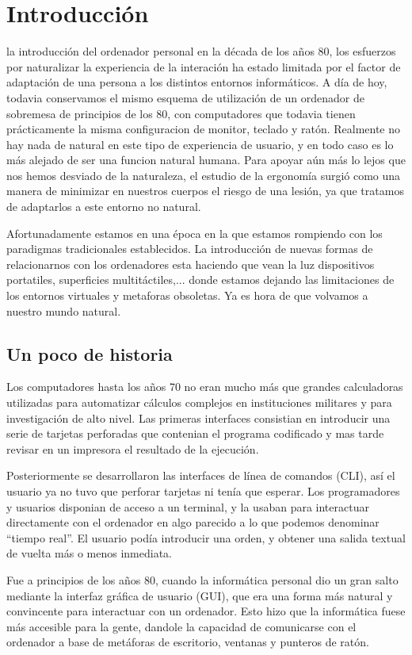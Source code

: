 \chapter{Introducción}
 la introducción del ordenador personal en la década de los años 80, los esfuerzos por naturalizar la experiencia de la interación ha estado limitada por el factor de adaptación de una persona a los distintos entornos informáticos. A día de hoy, todavia conservamos el mismo esquema de utilización de un ordenador de sobremesa de principios de los 80, con computadores que todavia tienen prácticamente la misma configuracion de monitor, teclado y ratón. Realmente no hay nada de natural en este tipo de experiencia de usuario, y en todo caso es lo más alejado de ser una funcion natural humana. Para apoyar aún más lo lejos que nos hemos desviado de la naturaleza, el estudio de la ergonomía surgió como una manera de minimizar en nuestros cuerpos el riesgo de una lesión, ya que tratamos de adaptarlos a este entorno no natural.

Afortunadamente estamos en una época en la que estamos rompiendo con los paradigmas tradicionales establecidos. La introducción de nuevas formas de relacionarnos con los ordenadores esta haciendo que vean la luz dispositivos portatiles, superficies multitáctiles,... donde estamos dejando las limitaciones de los entornos virtuales y metaforas obsoletas. Ya es hora de que volvamos a nuestro mundo natural.

\section{Un poco de historia}
Los computadores hasta los años 70 no eran mucho más que grandes calculadoras utilizadas para automatizar cálculos complejos en instituciones militares y para investigación de alto nivel. Las primeras interfaces consistian en introducir una serie de tarjetas perforadas que contenian el programa codificado y mas tarde revisar en un impresora el resultado de la ejecución.

Posteriormente se desarrollaron las interfaces de línea de comandos (CLI), así el usuario ya no tuvo que perforar tarjetas ni tenía que esperar. Los programadores y usuarios disponian de acceso a un terminal, y la usaban para interactuar directamente con el ordenador en algo parecido a lo que podemos denominar ``tiempo real''. El usuario podía introducir una orden, y obtener una salida textual de vuelta más o menos inmediata.

Fue a principios de los años 80, cuando la informática personal dio un gran salto mediante la interfaz gráfica de usuario (GUI), que era una forma más natural y convincente para interactuar con un ordenador. Esto hizo que la informática fuese más accesible para la gente, dandole la capacidad de comunicarse con el ordenador a base de metáforas de escritorio, ventanas y punteros de ratón.

